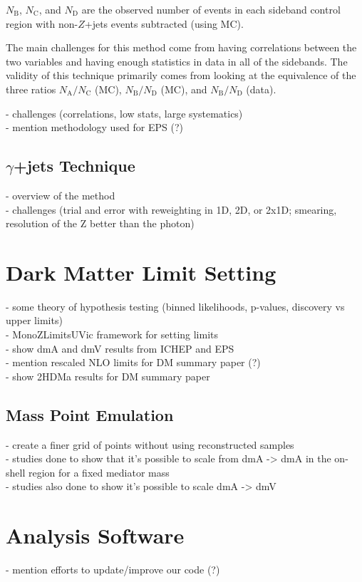 \noindent $N_\text{B}$, $N_\text{C}$, and $N_\text{D}$ are the observed number of events in each sideband control region with non-$Z$+jets events subtracted (using MC).

The main challenges for this method come from having correlations between the two variables and having enough statistics in data in all of the sidebands. The validity of this technique primarily comes from looking at the equivalence of the three ratios $N_\text{A}/N_\text{C}$ (MC), $N_\text{B}/N_\text{D}$ (MC), and $N_\text{B}/N_\text{D}$ (data).

- challenges (correlations, low stats, large systematics)\\
- mention methodology used for EPS (?)\\

\subsection{$\gamma$+jets Technique}

- overview of the method\\
- challenges (trial and error with reweighting in 1D, 2D, or 2x1D; smearing, resolution of the Z better than the photon)\\

\section{Dark Matter Limit Setting}
\label{sec:limits}

- some theory of hypothesis testing (binned likelihoods, p-values, discovery vs upper limits)\\
- MonoZLimitsUVic framework for setting limits\\
- show dmA and dmV results from ICHEP and EPS\\
- mention rescaled NLO limits for DM summary paper (?)\\
- show 2HDMa results for DM summary paper\\

\subsection{Mass Point Emulation}

- create a finer grid of points without using reconstructed samples\\
- studies done to show that it's possible to scale from dmA -> dmA in the on-shell region for a fixed mediator mass\\
- studies also done to show it's possible to scale dmA -> dmV\\

\section{Analysis Software}
\label{sec:code}
- mention efforts to update/improve our code (?)